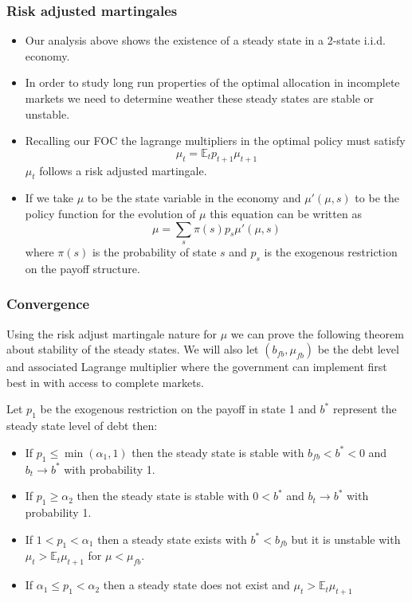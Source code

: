 \documentclass{beamer}
\newcommand{\EE}{\mathbb E}
\begin{document}
 \begin{frame}
  \frametitle{Risk adjusted martingales}
	\begin{itemize}
		\item Our analysis above shows the existence of a steady state in a 2-state i.i.d. economy.  
		\item In order to study long run properties of the optimal allocation in incomplete markets we need to determine weather these steady states are stable or unstable.
		\item Recalling our FOC the lagrange multipliers in the optimal policy must satisfy
		\[ 
			\mu_t = \EE_t p_{t+1} \mu_{t+1}
		\] $\mu_t$ follows a risk adjusted martingale.
		\item If we take $\mu$ to be the state variable in the economy and $\mu'(\mu,s)$ to be the policy function for the evolution of $\mu$ this equation can be written as
		\[ 
			\mu = \sum_s \pi(s) p_s \mu'(\mu,s)
		\] where $\pi(s)$ is the probability of state $s$ and $p_s$ is the exogenous restriction on the payoff structure.
	\end{itemize}
	
 \end{frame}
 
 \begin{frame}
  \frametitle{Convergence}
	Using the risk adjust martingale nature for $\mu$ we can prove the following theorem about stability of the steady states.  We will also let $(b_{fb},\mu_{fb})$ be the debt level and associated Lagrange multiplier where the government can implement first best in with access to complete markets.
	\begin{theorem}
		Let $p_1$ be the exogenous restriction on the payoff in state 1 and $b^*$ represent the steady state level of debt then:
		\begin{itemize}
			\item  If $p_1\leq\min(\alpha_1,1)$ then the steady state is stable with $b_{fb}<b^*<0$ and $b_t\rightarrow b^*$ with probability 1.
			\item If $p_1 \geq \alpha_2$ then the steady state is stable with $0<b^*$ and $b_t \rightarrow b^*$ with probability 1.
			\item  If $1 < p_1 <\alpha_1$ then a steady state exists with $b^* < b_{fb}$ but it is unstable with $\mu_t >\EE_t \mu_{t+1}$ for $\mu < \mu_{fb}$.
			\item  If $\alpha_1\leq p_1<\alpha_2$ then a steady state does not exist and $\mu_t > \EE_t\mu_{t+1}$
		\end{itemize} 
	\end{theorem} 
 \end{frame}
\end{document}
